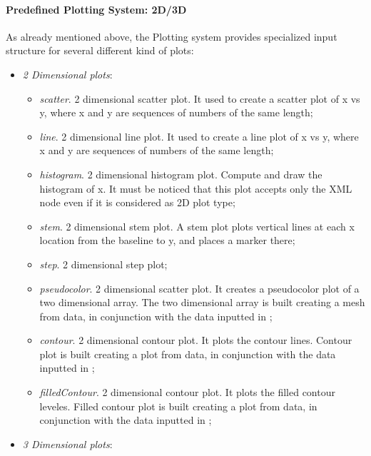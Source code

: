 \paragraph{Predefined Plotting System: 2D/3D \label{sec:23Dplotting}}
As already mentioned above, the Plotting system provides specialized input
structure for several different kind of plots:
 \begin{itemize}
  \item \textit{2 Dimensional plots}:
       \begin{itemize}
    \item \textit{scatter}.
    2 dimensional scatter plot.
    It used to create a scatter plot of x vs y, where x and y are sequences of
    numbers of the same length;
    \item \textit{line}.
    2 dimensional line plot.
    It used to create a line plot of x vs y, where x and y are sequences of
    numbers of the same length;
    \item \textit{histogram}.
    2 dimensional histogram plot.
    Compute and draw the histogram of x.
    It must be noticed that this plot accepts only the XML node  even if it
    is considered as 2D plot type;
    \item \textit{stem}.
    2 dimensional stem plot.
    A stem plot plots vertical lines at each x location from the baseline to y,
    and places a marker there;
    \item \textit{step}.
    2 dimensional step plot;
    \item \textit{pseudocolor}.
    2 dimensional scatter plot.
    It creates a pseudocolor plot of a two dimensional array.
    The two dimensional array is built creating a mesh from  data,
    in conjunction with the data inputted in ;
    \item \textit{contour}.
    2 dimensional contour plot.
    It plots the contour lines.
    Contour plot is built creating a plot from  data, in
    conjunction with the data inputted in ;
    \item \textit{filledContour}.
    2 dimensional contour plot.
    It plots the filled contour leveles.
    Filled contour plot is built creating a plot from  data, in
    conjunction with the data inputted in ;
      \end{itemize}
  \item \textit{3 Dimensional plots}:

\end{itemize}
